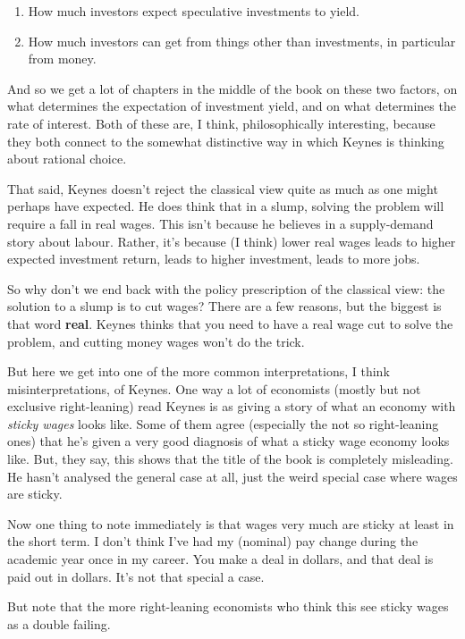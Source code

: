 \documentclass[
  11pt,
  letterpaper,
  DIV=11,
  numbers=noendperiod,
  oneside]{scrartcl}
\providecommand{\tightlist}{%
  \setlength{\itemsep}{0pt}\setlength{\parskip}{0pt}}\usepackage{longtable,booktabs,array}
\begin{document}
\begin{enumerate}
\def\labelenumi{\arabic{enumi}.}
\tightlist
\item
  How much investors expect speculative investments to yield.
\item
  How much investors can get from things other than investments, in
  particular from money.
\end{enumerate}

And so we get a lot of chapters in the middle of the book on these two
factors, on what determines the expectation of investment yield, and on
what determines the rate of interest. Both of these are, I think,
philosophically interesting, because they both connect to the somewhat
distinctive way in which Keynes is thinking about rational choice.

That said, Keynes doesn't reject the classical view quite as much as one
might perhaps have expected. He does think that in a slump, solving the
problem will require a fall in real wages. This isn't because he
believes in a supply-demand story about labour. Rather, it's because (I
think) lower real wages leads to higher expected investment return,
leads to higher investment, leads to more jobs.

So why don't we end back with the policy prescription of the classical
view: the solution to a slump is to cut wages? There are a few reasons,
but the biggest is that word \textbf{real}. Keynes thinks that you need
to have a real wage cut to solve the problem, and cutting money wages
won't do the trick.

But here we get into one of the more common interpretations, I think
misinterpretations, of Keynes. One way a lot of economists (mostly but
not exclusive right-leaning) read Keynes is as giving a story of what an
economy with \emph{sticky wages} looks like. Some of them agree
(especially the not so right-leaning ones) that he's given a very good
diagnosis of what a sticky wage economy looks like. But, they say, this
shows that the title of the book is completely misleading. He hasn't
analysed the general case at all, just the weird special case where
wages are sticky.

Now one thing to note immediately is that wages very much are sticky at
least in the short term. I don't think I've had my (nominal) pay change
during the academic year once in my career. You make a deal in dollars,
and that deal is paid out in dollars. It's not that special a case.

But note that the more right-leaning economists who think this see
sticky wages as a double failing.
\end{document}
